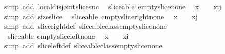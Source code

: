 \begin{isabellebody}
\ {\isacharparenleft}simp\ add{\isacharcolon}\ local{\isachardot}disjoint{\isacharunderscore}slice{\isacharunderscore}suc{\isacharparenright}%
\endisatagproof
{\isafoldproof}%
%
\isadelimproof
\isanewline
%
\endisadelimproof
\isanewline
{}\isamarkupfalse%
\ {\isacharparenleft}\ sliceable{\isacharparenright}\ empty{\isacharunderscore}slice{\isacharunderscore}none{\isacharcolon}\isanewline
\ \ {\isachardoublequoteopen}{\isacharparenleft}{\isacharhash}x{\isacharparenright}\ {\isacharequal}\ {}\ {\isasymLongrightarrow}\ {\isacharparenleft}{\isacharhash}{\isacharparenleft}x{\isasymdagger}i{\isachardot}{\isachardot}j{\isacharparenright}{\isacharparenright}\ {\isacharequal}\ {}{\isachardoublequoteclose}\isanewline
%
\isadelimproof
%
\endisadelimproof
%
\isatagproof
{}\isamarkupfalse%
\ {\isacharparenleft}simp\ add{\isacharcolon}\ size{\isacharunderscore}slice{\isacharparenright}%
\endisatagproof
{\isafoldproof}%
%
\isadelimproof
\isanewline
%
\endisadelimproof
\isanewline
{}\isamarkupfalse%
\ {\isacharparenleft}\ sliceable{\isacharparenright}\ empty{\isacharunderscore}slice{\isacharunderscore}right{\isacharunderscore}none{\isacharcolon}\isanewline
\ \ {\isachardoublequoteopen}{\isacharparenleft}{\isacharhash}x{\isacharparenright}\ {\isacharequal}\ {}\ {\isasymLongrightarrow}\ {\isacharparenleft}{\isacharhash}{\isacharparenleft}x{\isasymdagger}{\isachardot}{\isachardot}j{\isacharparenright}{\isacharparenright}\ {\isacharequal}\ {}{\isachardoublequoteclose}\isanewline
%
\isadelimproof
%
\endisadelimproof
%
\isatagproof
{}\isamarkupfalse%
\ {\isacharparenleft}simp\ add{\isacharcolon}\ slice{\isacharunderscore}right{\isacharunderscore}def\ sliceable{\isacharunderscore}class{\isachardot}empty{\isacharunderscore}slice{\isacharunderscore}none{\isacharparenright}%
\endisatagproof
{\isafoldproof}%
%
\isadelimproof
\isanewline
%
\endisadelimproof
\isanewline
{}\isamarkupfalse%
\ {\isacharparenleft}\ sliceable{\isacharparenright}\ empty{\isacharunderscore}slice{\isacharunderscore}left{\isacharunderscore}none{\isacharcolon}\isanewline
\ \ {\isachardoublequoteopen}{\isacharparenleft}{\isacharhash}x{\isacharparenright}\ {\isacharequal}\ {}\ {\isasymLongrightarrow}\ {\isacharparenleft}{\isacharhash}{\isacharparenleft}x{\isasymdagger}i{\isachardot}{\isachardot}{\isacharparenright}{\isacharparenright}\ {\isacharequal}\ {}{\isachardoublequoteclose}\isanewline
%
\isadelimproof
%
\endisadelimproof
%
\isatagproof
{}\isamarkupfalse%
\ {\isacharparenleft}simp\ add{\isacharcolon}\ slice{\isacharunderscore}left{\isacharunderscore}def\ sliceable{\isacharunderscore}class{\isachardot}empty{\isacharunderscore}slice{\isacharunderscore}none{\isacharparenright}\isanewline
%
\endisatagproof
{\isafoldproof}%
%
\isadelimproof
%
\endisadelimproof
%
\isadelimtheory
%
\endisadelimtheory
%
\isatagtheory
%
\endisatagtheory
{\isafoldtheory}%
%
\isadelimtheory
%
\endisadelimtheory
%
\end{isabellebody}%
